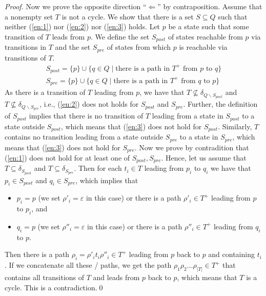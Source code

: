 \documentclass[runningheads]{llncs}
\newcommand{\pre}{{S_\mathit{pre}}}
\newcommand{\post}{{S_\mathit{post}}}
\begin{document}
\begin{proof}
  Now we prove the opposite direction ``$\Longleftarrow$'' by
  contraposition. Assume that a nonempty set $T$ is not a cycle. We
  show that there is a set $S\subseteq Q$ such that neither
  (\ref{en:1}) nor (\ref{en:2}) nor (\ref{en:3}) holds. Let $p$ be a
  state such that some transition of $T$ leads from $p$. We define the
  set $\post$ of states reachable from $p$ via transitions in $T$ and the set
  $\pre$ of states from which $p$ is reachable via transitions of $T$.
  \[
    \begin{array}{r}
    \post=\{p\}\cup\{q\in Q\mid \textrm{there is a path in }T^+\textrm{ from }p\textrm{ to }q\}\\[.5ex]
    \pre=\{p\}\cup\{q\in Q\mid \textrm{there is a path in }T^+\textrm{ from }q\textrm{ to }p\}
    \end{array}
  \]  
  As there is a transition of $T$ leading from $p$, we have that
  $T\not\subseteq\delta_{Q\smallsetminus\post}$ and
  $T\not\subseteq\delta_{Q\smallsetminus\pre}$, i.e., (\ref{en:2})
  does not holds for $\post$ and $\pre$. Further, the definition of
  $\post$ implies that there is no transition of $T$ leading from a
  state in $\post$ to a state outside $\post$, which means that
  (\ref{en:3}) does not hold for $\post$. Similarly, $T$ contains no
  transition leading from a state outside $\pre$ to a state in $\pre$,
  which means that (\ref{en:3}) does not hold for $\pre$. Now we prove
  by contradition that (\ref{en:1}) does not hold for at least one of
  $\post,\pre$. Hence, let us assume that $T\subseteq\delta_\post$ and
  $T\subseteq\delta_\pre$. Then for each $t_i\in T$ leading from $p_i$
  to $q_i$ we have that $p_i\in\post$ and $q_i\in\pre$, which implies
  that
  \begin{itemize}
  \item $p_i=p$ (we set $\rho'_i=\varepsilon$ in this case) or
    there is a path $\rho'_i\in T^+$ leading from $p$ to $p_i$, and
  \item $q_i=p$ (we set $\rho''_i=\varepsilon$ in this case) or
    there is a path $\rho''_i\in T^+$ leading from $q_i$ to $p$.
  \end{itemize}
  Then there is a path $\rho_i=\rho'_it_i\rho''_i\in T^+$ leading from
  $p$ back to $p$ and containing $t_i$. If we concatenate all these
/  paths, we get the path $\rho_1\rho_2\ldots\rho_{|T|}\in T^+$ that
  contains all transitions of $T$ and leads from $p$ back to $p$,
  which means that $T$ is a cycle.  This is a contradiction.\qed
\end{proof}
\end{document}
